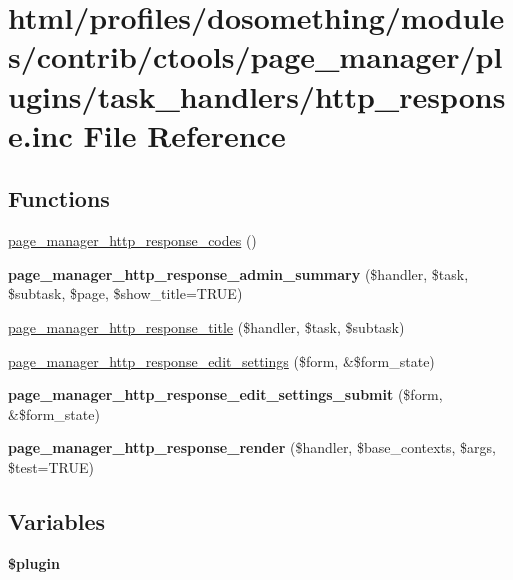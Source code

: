 \hypertarget{http__response_8inc}{
\section{html/profiles/dosomething/modules/contrib/ctools/page\_\-manager/plugins/task\_\-handlers/http\_\-response.inc File Reference}
\label{http__response_8inc}
}
\subsection*{Functions}
\begin{DoxyCompactItemize}
\item 
\hyperlink{http__response_8inc_a4e23931f8f0b06937eeb34e64c74eae9}{page\_\-manager\_\-http\_\-response\_\-codes} ()
\item 
\hypertarget{http__response_8inc_a7222a80cf7baeaf8381fa12730cf5e4e}{
{\bfseries page\_\-manager\_\-http\_\-response\_\-admin\_\-summary} (\$handler, \$task, \$subtask, \$page, \$show\_\-title=TRUE)}
\label{http__response_8inc_a7222a80cf7baeaf8381fa12730cf5e4e}

\item 
\hyperlink{http__response_8inc_ac070590f089da932568b8a02349b17af}{page\_\-manager\_\-http\_\-response\_\-title} (\$handler, \$task, \$subtask)
\item 
\hyperlink{http__response_8inc_acaccd5ee81afb68b234c1a49f036cda3}{page\_\-manager\_\-http\_\-response\_\-edit\_\-settings} (\$form, \&\$form\_\-state)
\item 
\hypertarget{http__response_8inc_ac8bf918c849e0344f62792a92b3a390a}{
{\bfseries page\_\-manager\_\-http\_\-response\_\-edit\_\-settings\_\-submit} (\$form, \&\$form\_\-state)}
\label{http__response_8inc_ac8bf918c849e0344f62792a92b3a390a}

\item 
\hypertarget{http__response_8inc_a9dafc16c8e3f25d3a0388f4ff95b70a5}{
{\bfseries page\_\-manager\_\-http\_\-response\_\-render} (\$handler, \$base\_\-contexts, \$args, \$test=TRUE)}
\label{http__response_8inc_a9dafc16c8e3f25d3a0388f4ff95b70a5}

\end{DoxyCompactItemize}
\subsection*{Variables}
\begin{DoxyCompactItemize}
\item 
\hypertarget{http__response_8inc_ada8a7130088351710bb02ed622d6bf65}{
{\bfseries \$plugin}}
\label{http__response_8inc_ada8a7130088351710bb02ed622d6bf65}

\end{DoxyCompactItemize}


